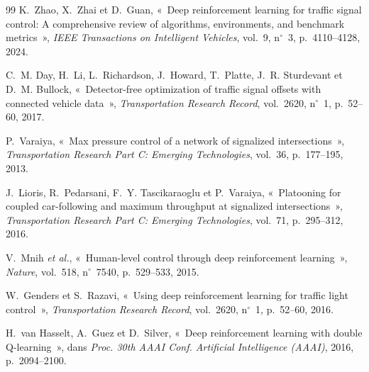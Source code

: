 \documentclass[11pt,a4paper]{article}
\begin{document}
\begin{thebibliography}{99}
K.~Zhao, X.~Zhai et D.~Guan, «~Deep reinforcement learning for traffic signal control: A comprehensive review of algorithms, environments, and benchmark metrics~», \emph{IEEE Transactions on Intelligent Vehicles}, vol.~9, n$^\circ$~3, p.~4110--4128, 2024.

C.~M. Day, H.~Li, L.~Richardson, J.~Howard, T.~Platte, J.~R. Sturdevant et D.~M. Bullock, «~Detector-free optimization of traffic signal offsets with connected vehicle data~», \emph{Transportation Research Record}, vol.~2620, n$^\circ$~1, p.~52--60, 2017.

P.~Varaiya, «~Max pressure control of a network of signalized intersections~», \emph{Transportation Research Part C: Emerging Technologies}, vol.~36, p.~177--195, 2013.

J.~Lioris, R.~Pedarsani, F.~Y. Tascikaraoglu et P.~Varaiya, «~Platooning for coupled car-following and maximum throughput at signalized intersections~», \emph{Transportation Research Part C: Emerging Technologies}, vol.~71, p.~295--312, 2016.

V.~Mnih \emph{et al.}, «~Human-level control through deep reinforcement learning~», \emph{Nature}, vol.~518, n$^\circ$~7540, p.~529--533, 2015.

W.~Genders et S.~Razavi, «~Using deep reinforcement learning for traffic light control~», \emph{Transportation Research Record}, vol.~2620, n$^\circ$~1, p.~52--60, 2016.

H.~van Hasselt, A.~Guez et D.~Silver, «~Deep reinforcement learning with double Q-learning~», dans \emph{Proc. 30th AAAI Conf. Artificial Intelligence (AAAI)}, 2016, p.~2094--2100.

\end{thebibliography}
\end{document}
